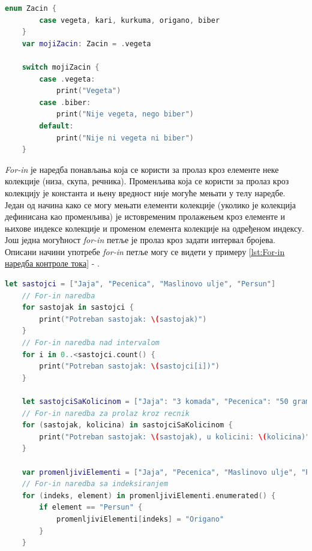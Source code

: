 \documentclass[12pt,oneside]{memoir}
\begin{document}
\begin{lstlisting}[caption=\textit{{Switch наредба контроле тока}}, label={lst:Switch наредба контроле тока}, language=Swift, frame=single]
    enum Zacin {
        case vegeta, kari, kurkuma, origano, biber
    }
    var mojiZacin: Zacin = .vegeta
    
    switch mojiZacin {
        case .vegeta:
            print("Vegeta")
        case .biber:
            print("Nije vegeta, nego biber")
        default:
            print("Nije ni vegeta ni biber")
    }
\end{lstlisting}

\indent \textit{For-in} је наредба понављања која се користи за пролаз кроз елементе неке колекције (низа, скупа, речника). Променљива која се користи за пролаз кроз колекцију је константа и њену вредност није могуће мењати у телу наредбе. Један од начина како се могу мењати елементи колекције (уколико је колекција дефинисана као променљива) је истовременим пролажењем кроз елементе и њихове индексе колекције и променом елемента колекције на одређеном индексу. Још једна могућност \textit{for-in} петље је пролаз кроз задати интервал бројева. Описани начини употребе \textit{for-in} петље могу се видети у примеру \ref{lst:For-in наредба контроле тока} - .
\begin{lstlisting}[caption=\textit{{For-in наредбa контроле тока}}, label={lst:For-in наредба контроле тока}, language=Swift, frame=single]
    let sastojci = ["Jaja", "Pecenica", "Maslinovo ulje", "Persun"]
    // For-in naredba
    for sastojak in sastojci {
        print("Potreban sastojak: \(sastojak)")
    }
    // For-in naredba nad intervalom
    for i in 0..<sastojci.count() {
        print("Potreban sastojak: \(sastojci[i])")
    }
    
    let sastojciSaKolicinom = ["Jaja": "3 komada", "Pecenica": "50 grama", "Maslinovo ulje": "Koliko je potrebno da pokrije tiganj", "Persun": "Prstohvat"]
    // For-in naredba za prolaz kroz recnik
    for (sastojak, kolicina) in sastojciSaKolicinom {
        print("Potreban sastojak: \(sastojak), u kolicini: \(kolicina)")
    }
    
    var promenljiviElementi = ["Jaja", "Pecenica", "Maslinovo ulje", "Persun"]
    // For-in naredba sa indeksiranjem
    for (indeks, element) in promenljiviElementi.enumerated() {
        if element == "Persun" {
            promenljiviElementi[indeks] = "Origano"
        }
    } 
\end{lstlisting}
\end{document}
